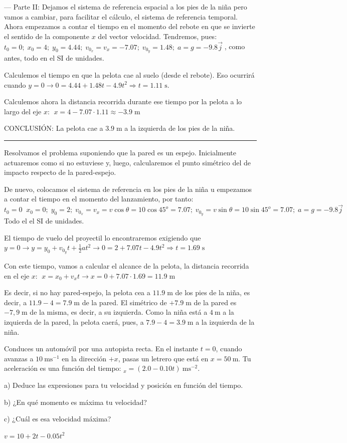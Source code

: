 --- Parte II: Dejamos el sistema de referencia espacial a los pies de la niña pero vamos a cambiar, para facilitar el cálculo, el sistema de referencia temporal. Ahora empezamos a contar el tiempo en el momento del rebote en que se invierte el sentido de la componente $x$ del vector velocidad. Tendremos, pues: $t_0=0;\; x_0=4;\; y_0=4.44;\; v_{0_x}=v_x=-7.07;\; v_{0_y}=1.48;\; a=g=-9.8\vec j\;$, como antes, todo en el SI de unidades.

Calculemos el tiempo en que la pelota cae al suelo (desde el rebote). Eso ocurrirá cuando $y=0\to 0=4.44+1.48t-4.9t^2\Rightarrow t=1.11\; \mathrm{s}$.

Calculemos ahora la distancia recorrida durante ese tiempo por la pelota a lo largo del eje $x$: $\;x=4-7.07\cdot 1.11\approx -3.9\;\mathrm{m}$

CONCLUSIÓN: La pelota cae a $3.9\;\mathrm{m}$ a la izquierda de los pies de la niña.

\rule{150pt}{0.4pt} 

Resolvamos el problema suponiendo que la pared es un espejo. Inicialmente actuaremos como si no estuviese y, luego, calcularemos el punto simétrico del de impacto respecto de la pared-espejo.

De nuevo, colocamos el sistema de referencia en los pies de la niña u empezamos a contar el tiempo en el momento del lanzamiento, por tanto: $t_0=0\;\; x_0=0;\; y_0=2;\; v_{0_x}=v_x=v\cos \theta=10\cos 45^o=7.07;\; v_{0_y}=v\sin \theta=10\sin 45^o=7.07;\; a=g=-9.8\vec j\;$ Todo el el SI de unidades.

El tiempo de vuelo del proyectil lo encontraremos exigiendo que $y=0 \to y=y_0+v_{0_y}t+\frac 1 2 a t^2 \to 0=2+7.07t-4.9t^2 \Rightarrow t=1.69\;\mathrm{s}$

Con este tiempo, vamos a calcular el alcance de la pelota, la distancia recorrida en el eje $x$: $\; x=x_0+v_xt\to x=0+7.07\cdot 1.69=11.9\;\mathrm{m}$

Es decir, si no hay pared-espejo, la pelota cea a $11.9\;\mathrm{m}$ de los pies de la niña, es decir, a $11.9-4=7.9\;\mathrm{m}$ de la pared.  El simétrico de $+7.9\;\mathrm{m}$ de la pared es $-7,9\;\mathrm{m}$ de la misma, es decir, a su izquierda. Como la niña está a $4\:\mathrm{m}$ a la izquierda de la pared, la pelota caerá, pues, a $7.9-4=3.9\;\mathrm{m}$ a la izquierda de la niña.

\begin{prob}
Conduces un automóvil por una autopista recta. En el instante $t = 0$, cuando avanzas a $10 \ \mathrm{ms}^{-1}$ en la dirección $+x$, pasas un letrero que está en $x= 50 \ \mathrm{m}$. Tu aceleración es una función del tiempo: $_x = (2.0 - 0.10 t)\ \mathrm{ms}^{-2}$. 

a) Deduce las expresiones para tu velocidad y posición en función del tiempo.  

b) ¿En qué momento es máxima tu velocidad?  

c) ¿Cuál es esa velocidad máxima?  
\end{prob}
$v=10+2t-0.05t^2$ 

